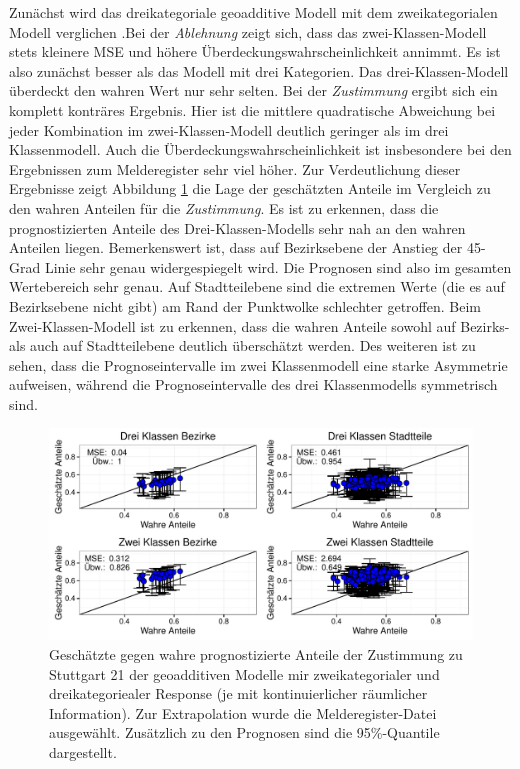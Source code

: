 \documentclass{Vorlage}
\begin{document}
Zunächst wird das dreikategoriale geoadditive Modell mit dem zweikategorialen Modell verglichen .Bei der \textit{Ablehnung} zeigt sich, dass das zwei-Klassen-Modell stets kleinere MSE und höhere Überdeckungswahrscheinlichkeit annimmt. Es ist also zunächst besser als das Modell mit drei Kategorien. Das drei-Klassen-Modell überdeckt den wahren Wert nur sehr selten. Bei der \textit{Zustimmung} ergibt sich ein komplett konträres Ergebnis. Hier ist die mittlere quadratische Abweichung bei jeder Kombination im zwei-Klassen-Modell deutlich geringer als im drei Klassenmodell. Auch die Überdeckungswahrscheinlichkeit ist insbesondere bei den Ergebnissen zum Melderegister sehr viel höher. Zur Verdeutlichung dieser Ergebnisse zeigt Abbildung \ref{vali4} die Lage der geschätzten Anteile im Vergleich zu den wahren Anteilen für die \textit{Zustimmung}. Es ist zu erkennen, dass die prognostizierten Anteile des Drei-Klassen-Modells sehr nah an den wahren Anteilen liegen. Bemerkenswert ist, dass auf Bezirksebene der Anstieg der 45-Grad Linie sehr genau widergespiegelt wird. Die Prognosen sind also im gesamten Wertebereich sehr genau. Auf Stadtteilebene sind die extremen Werte (die es auf Bezirksebene nicht gibt) am Rand der Punktwolke schlechter getroffen. Beim Zwei-Klassen-Modell ist zu erkennen, dass die wahren Anteile sowohl auf Bezirks- als auch auf Stadtteilebene deutlich überschätzt werden. Des weiteren ist zu sehen, dass die Prognoseintervalle im zwei Klassenmodell eine starke Asymmetrie aufweisen, während die Prognoseintervalle des drei Klassenmodells symmetrisch sind.

\begin{figure}[h]
 \begin{center}
 \includegraphics[scale=0.8]{Pictures/PaT2}
 \caption{Geschätzte gegen wahre prognostizierte Anteile der Zustimmung zu Stuttgart 21 der geoadditiven Modelle mir zweikategorialer und dreikategoriealer Response (je mit kontinuierlicher räumlicher Information). Zur Extrapolation wurde die Melderegister-Datei ausgewählt. Zusätzlich zu den Prognosen sind die 95\%-Quantile dargestellt.}
 \label{vali4}
 \end{center}
\end{figure}
\end{document}
